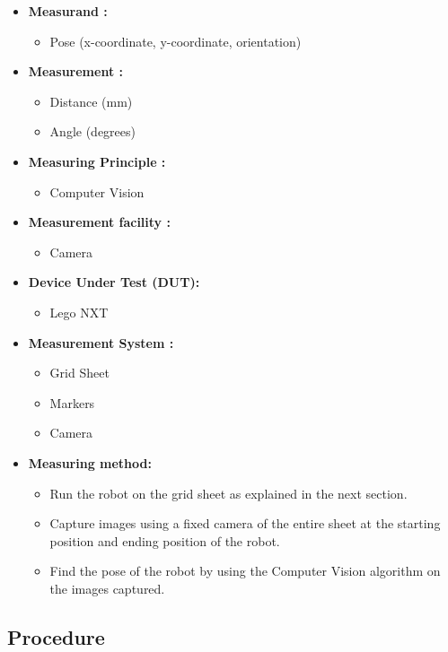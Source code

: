 \documentclass[10pt,a4paper]{article}
\begin{document}
	\begin{itemize}
		\item	
		\textbf{Measurand :}
		\begin{itemize}
			\item
			Pose (x-coordinate, y-coordinate, orientation)
		\end{itemize}
		
		\item
		\textbf{Measurement :}
		\begin{itemize}
			\item
			Distance (mm)
			\item
			Angle (degrees)
		\end{itemize}
		\item
		\textbf{Measuring Principle :}
		\begin{itemize}
			\item
			Computer Vision
		\end{itemize} 
		\item
		\textbf{Measurement facility :}
		\begin{itemize}
			\item
			Camera
		\end{itemize} 
		\item
		\textbf{Device Under Test (DUT):}
		\begin{itemize}
			\item
			Lego NXT
		\end{itemize} 
		\item
		\textbf{Measurement System :}
		\begin{itemize}
			\item
			Grid Sheet
			\item
			Markers
			\item
			Camera
		\end{itemize}
		\item
		\textbf{Measuring method: }
		\begin{itemize}
			\item
			Run the robot on the grid sheet as explained in the next section.
			\item
			Capture images using a fixed camera of the entire sheet at the starting position and ending position of the robot.
			\item
			Find the pose of the robot by using the Computer Vision algorithm on the images captured.
		\end{itemize}
\end{itemize}

\subsection{Procedure}
\end{document}
